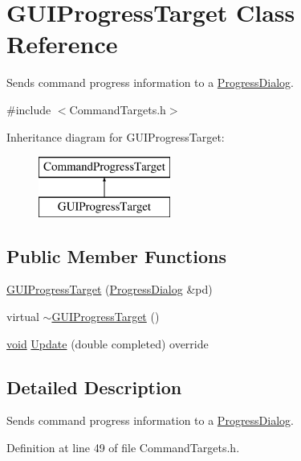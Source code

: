 \hypertarget{class_g_u_i_progress_target}{}\section{G\+U\+I\+Progress\+Target Class Reference}
\label{class_g_u_i_progress_target}


Sends command progress information to a \hyperlink{class_progress_dialog}{Progress\+Dialog}.  




{\ttfamily \#include $<$Command\+Targets.\+h$>$}

Inheritance diagram for G\+U\+I\+Progress\+Target\+:\begin{figure}[H]
\begin{center}
\leavevmode
\includegraphics[height=2.000000cm]{class_g_u_i_progress_target}
\end{center}
\end{figure}
\subsection*{Public Member Functions}
\begin{DoxyCompactItemize}
\item 
\hyperlink{class_g_u_i_progress_target_a4591e922fd2bc90ce6b5ceb9817a6290}{G\+U\+I\+Progress\+Target} (\hyperlink{class_progress_dialog}{Progress\+Dialog} \&pd)
\item 
virtual \hyperlink{class_g_u_i_progress_target_a25628083a7c5d2b6cd4db1f39e5f3875}{$\sim$\+G\+U\+I\+Progress\+Target} ()
\item 
\hyperlink{sound_8c_ae35f5844602719cf66324f4de2a658b3}{void} \hyperlink{class_g_u_i_progress_target_a80c80116d6bd9e66a55824de7e216ce3}{Update} (double completed) override
\end{DoxyCompactItemize}


\subsection{Detailed Description}
Sends command progress information to a \hyperlink{class_progress_dialog}{Progress\+Dialog}. 

Definition at line 49 of file Command\+Targets.\+h.



